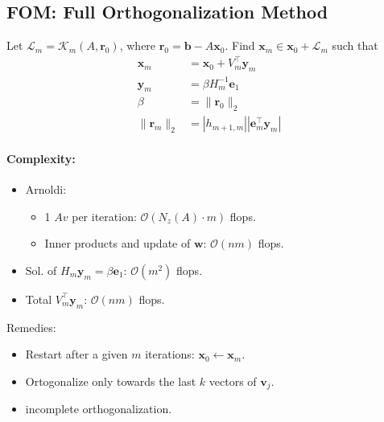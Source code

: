\subsection{FOM: Full Orthogonalization Method}
Let $\mathcal{L}_m = \mathcal{K}_m(A, \mathbf{r}_0)$, where $\mathbf{r}_0 = \mathbf{b} - A\mathbf{x}_0$. Find $\mathbf{x}_m \in \mathbf{x}_0 + \mathcal{L}_m$ such that
\begin{align*}
    \mathbf{x}_m       & = \mathbf{x}_0 + V_m^\top \mathbf{y}_m         \\
    \mathbf{y}_m       & = \beta H_m^{-1} \mathbf{e}_1                  \\
    \beta              & = \|\mathbf{r}_0\|_2                           \\
    \|\mathbf{r}_m\|_2 & = |h_{m+1,m}| |\mathbf{e}_m^\top \mathbf{y}_m|
\end{align*}

\paragraph{Complexity:}
\begin{itemize}
    \item Arnoldi:
          \begin{itemize}
              \item 1 $Av$ per iteration: $\mathcal{O}(N_z(A)\cdot m)$ flops.
              \item Inner products and update of $\mathbf{w}$: $\mathcal{O}(nm)$ flops.
          \end{itemize}
    \item Sol. of $H_m \mathbf{y}_m = \beta \mathbf{e}_1$: $\mathcal{O}(m^2)$ flops.
    \item Total $V_m^\top \mathbf{y}_m$: $\mathcal{O}(nm)$ flops.
\end{itemize}

Remedies:
\begin{itemize}
    \item Restart after a given $m$ iterations: $\mathbf{x}_0 \leftarrow \mathbf{x}_m$.
    \item Ortogonalize only towards the last $k$ vectors of $\mathbf{v}_j$.
    \item incomplete orthogonalization.
\end{itemize}

